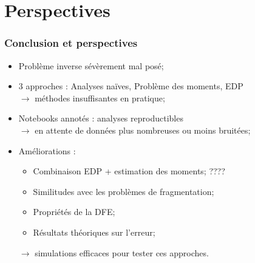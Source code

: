 \documentclass{beamer}
\begin{document}
%  
%
%


\section*{Perspectives}

\begin{frame}
  \frametitle{Conclusion et perspectives}
  \begin{itemize}[label=$\bullet$]
    \item Problème inverse sévèrement mal posé;
    \vspace{3mm}
    \item 3 approches : Analyses naïves, Problème des moments, EDP \\
    $\to$ méthodes insuffisantes en pratique;
    \vspace{3mm}\pause
    \item Notebooks annotés : analyses reproductibles\\
    $\to$ en attente de données plus nombreuses ou moins bruitées;
    \vspace{3mm}\pause
    \item Améliorations :
    \begin{itemize}[label=$\star$]
    	\item Combinaison EDP + estimation des moments; ????
	\item Similitudes avec les problèmes de fragmentation;          
	\item Propriétés de la DFE;
        \item Résultats théoriques sur l'erreur;
    \end{itemize}
    $\to$ simulations efficaces pour tester ces approches.
  \end{itemize}
\end{frame}
\end{document}
